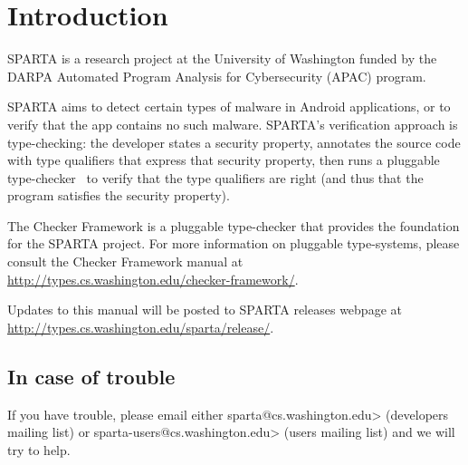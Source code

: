 \htmlhr
\chapter{Introduction\label{introduction}}

SPARTA is a research project at the University of Washington funded by the DARPA
 Automated Program Analysis for Cybersecurity (APAC) program.


SPARTA aims to detect certain types of malware in Android applications, or
to verify that the app contains no such malware.  SPARTA's verification
approach is type-checking:  the developer states a security property,
annotates the source code with type qualifiers that express that security
property, then runs a pluggable type-checker~\cite{PapiACPE2008,DietlDEMS2011} to verify that the type
qualifiers are right (and thus that the program satisfies the security
property).


The Checker Framework is a pluggable type-checker that provides the foundation for the SPARTA project. 
For more information on pluggable type-systems, please consult the Checker Framework manual at 
\url{http://types.cs.washington.edu/checker-framework/}.  


Updates to this manual will be posted to SPARTA releases webpage at
\url{http://types.cs.washington.edu/sparta/release/}.


\section{In case of trouble}

If you have trouble, please email either
\<sparta@cs.washington.edu>
(developers mailing list) or
\<sparta-users@cs.washington.edu> (users
mailing list) and we will try to help.






